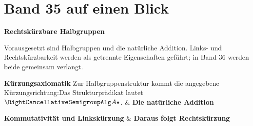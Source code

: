 \chapter[Band 35: Rechtskürzbare Halbgruppen]{Band 35 auf einen Blick}
\noindent\textbf{Rechtskürzbare Halbgruppen}\par\medskip
Vorausgesetzt sind Halbgruppen und die natürliche Addition.
Links- und Rechtskürzbarkeit werden als getrennte Eigenschaften geführt;
in Band 36 werden beide gemeinsam verlangt.

\begin{BandUebersicht}
\textbf{Kürzungsaxiomatik}
Zur Halbgruppenstruktur kommt die angegebene Kürzungsrichtung:Das Strukturprädikat lautet \(\RightCancellativeSemigroupAlg A\star\).
&
\textbf{Die natürliche Addition}
 \\
\addlinespace[.8ex]

\textbf{Kommutativität und Linkskürzung}
&
\textbf{Daraus folgt Rechtskürzung}
 \\
\addlinespace[.8ex]


\end{BandUebersicht}
